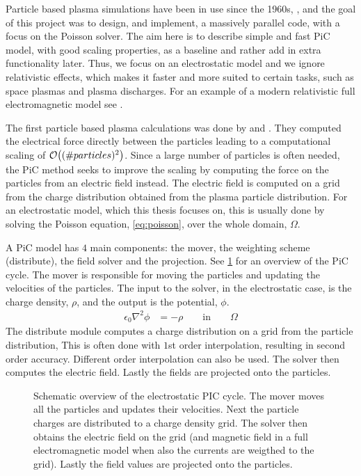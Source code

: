
    Particle based plasma simulations have been in use since the 1960s, \citep{verboncoeur_particle_2005},
    and the goal of this project was to design, and implement, a massively parallel code,
    with a focus on the Poisson solver.
    The aim here is to describe simple and fast PiC model, with good scaling properties, as a baseline
    and rather add in extra functionality later. Thus, we focus on an electrostatic model and
    we ignore relativistic effects, which makes it faster and more suited to certain tasks, such as
	space plasmas and plasma discharges.
    For an example of a modern relativistic full electromagnetic model see
    \citet{sgattoni_piccante:_2015}.

    The first particle based plasma calculations was
    done by \citet{dawson_one-dimensional_1962} and \citet{buneman_dissipation_1959}.
    They computed the electrical force directly between the particles leading
    to a computational scaling of \(\order{(\#particles)^2}\).
    Since a large number of particles is often needed, the PiC method seeks to improve
    the scaling by computing the force on the particles from an electric field instead.
    The electric field is computed on a grid from the charge distribution obtained from the plasma particle
	distribution. For an electrostatic model, which this thesis focuses on, this is usually done by solving the Poisson
    equation, \cref{eq:poisson}, over the whole domain, \(\Omega\).

	A PiC model has \(4\) main components: the mover, the weighting scheme (distribute), the field solver
	and the projection. See \cref{fig:schematic} for an overview of the PiC cycle.
	The mover is responsible for moving the particles and updating the velocities of the particles.
    The input to the solver, in the electrostatic case, is the charge density, \(\rho\), and the output is the potential, \(\phi\).
    \begin{align}
        \epsilon_0 \nabla ^2 \phi &= -\rho \qquad \text{in} \qquad \Omega \label{eq:poisson}
    \end{align}
    The distribute module computes a charge distribution on a grid from the particle distribution,
	This is often done with \(1\)st order interpolation, resulting in second order accuracy. Different order
	interpolation can also be used.
    The solver then computes the electric field.
    Lastly the fields are projected onto the particles.

    \begin{figure}
        \center
        
        \caption{Schematic overview of the electrostatic PIC cycle. The mover moves all the particles and updates their velocities.
        Next the particle charges are distributed to a charge density grid. The solver then
        obtains the electric field on the grid (and magnetic field in a full electromagnetic model when also the currents are weigthed to the grid). Lastly the field values are
		projected onto the particles.}
        \label{fig:schematic}
    \end{figure}

